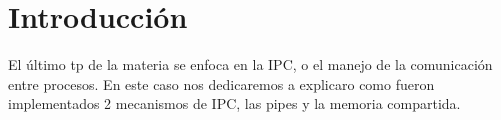 \section{Introducción}

El último tp de la materia se enfoca en la IPC, o el manejo de la comunicación
entre procesos. En este caso nos dedicaremos a explicaro como fueron
implementados 2 mecanismos de IPC, las pipes y la memoria compartida.
